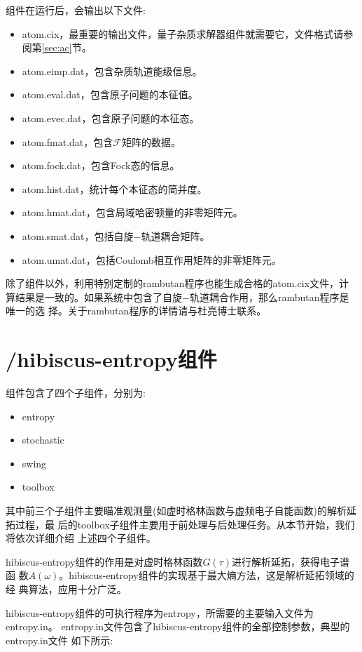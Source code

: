 {\jasmine}组件在运行后，会输出以下文件:

\begin{itemize}
\item atom.cix，最重要的输出文件，量子杂质求解器组件就需要它，文件格式请参阅第\ref{sec:ac}节。
\item atom.eimp.dat，包含杂质轨道能级信息。
\item atom.eval.dat，包含原子问题的本征值。
\item atom.evec.dat，包含原子问题的本征态。
\item atom.fmat.dat，包含$\mathcal{F}$矩阵的数据。
\item atom.fock.dat，包含Fock态的信息。
\item atom.hist.dat，统计每个本征态的简并度。
\item atom.hmat.dat，包含局域哈密顿量的非零矩阵元。
\item atom.smat.dat，包括自旋$-$轨道耦合矩阵。
\item atom.umat.dat，包括Coulomb相互作用矩阵的非零矩阵元。
\end{itemize}

除了{\jasmine}组件以外，利用特别定制的rambutan程序也能生成合格的atom.cix文件，计
算结果是一致的。如果系统中包含了自旋$-$轨道耦合作用，那么rambutan程序是唯一的选
择。关于rambutan程序的详情请与杜亮博士联系。

\section{{\hibiscus}/hibiscus-entropy组件}
\label{sec:hib-ent}

{\hibiscus}组件包含了四个子组件，分别为:
\begin{itemize}
\item entropy
\item stochastic
\item swing
\item toolbox
\end{itemize}
其中前三个子组件主要瞄准观测量(如虚时格林函数与虚频电子自能函数)的解析延拓过程，最
后的toolbox子组件主要用于前处理与后处理任务。从本节开始，我们将依次详细介绍
上述四个子组件。

hibiscus-entropy组件的作用是对虚时格林函数$G(\tau)$进行解析延拓，获得电子谱函
数$A(\omega)$。hibiscus-entropy组件的实现基于最大熵方法，这是解析延拓领域的经
典算法，应用十分广泛\cite{jarrell:133}。

hibiscus-entropy组件的可执行程序为entropy，所需要的主要输入文件为entropy.in。
entropy.in文件包含了hibiscus-entropy组件的全部控制参数，典型的entropy.in文件
如下所示:

